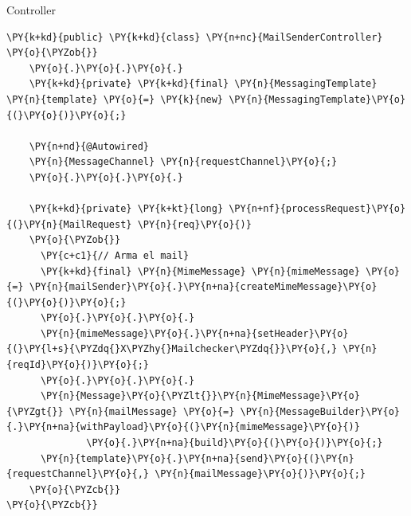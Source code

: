 \documentclass{beamer}
\begin{document}
\begin{frame}[fragile]{Controller}
\begin{Verbatim}[fontsize=\tiny,commandchars=\\\{\}]
\PY{k+kd}{public} \PY{k+kd}{class} \PY{n+nc}{MailSenderController}
\PY{o}{\PYZob{}}
    \PY{o}{.}\PY{o}{.}\PY{o}{.}
    \PY{k+kd}{private} \PY{k+kd}{final} \PY{n}{MessagingTemplate} \PY{n}{template} \PY{o}{=} \PY{k}{new} \PY{n}{MessagingTemplate}\PY{o}{(}\PY{o}{)}\PY{o}{;}

    \PY{n+nd}{@Autowired}
    \PY{n}{MessageChannel} \PY{n}{requestChannel}\PY{o}{;}
    \PY{o}{.}\PY{o}{.}\PY{o}{.}
    
    \PY{k+kd}{private} \PY{k+kt}{long} \PY{n+nf}{processRequest}\PY{o}{(}\PY{n}{MailRequest} \PY{n}{req}\PY{o}{)}
    \PY{o}{\PYZob{}}
      \PY{c+c1}{// Arma el mail}
      \PY{k+kd}{final} \PY{n}{MimeMessage} \PY{n}{mimeMessage} \PY{o}{=} \PY{n}{mailSender}\PY{o}{.}\PY{n+na}{createMimeMessage}\PY{o}{(}\PY{o}{)}\PY{o}{;}
      \PY{o}{.}\PY{o}{.}\PY{o}{.}
      \PY{n}{mimeMessage}\PY{o}{.}\PY{n+na}{setHeader}\PY{o}{(}\PY{l+s}{\PYZdq{}X\PYZhy{}Mailchecker\PYZdq{}}\PY{o}{,} \PY{n}{reqId}\PY{o}{)}\PY{o}{;}
      \PY{o}{.}\PY{o}{.}\PY{o}{.}
      \PY{n}{Message}\PY{o}{\PYZlt{}}\PY{n}{MimeMessage}\PY{o}{\PYZgt{}} \PY{n}{mailMessage} \PY{o}{=} \PY{n}{MessageBuilder}\PY{o}{.}\PY{n+na}{withPayload}\PY{o}{(}\PY{n}{mimeMessage}\PY{o}{)}
              \PY{o}{.}\PY{n+na}{build}\PY{o}{(}\PY{o}{)}\PY{o}{;}
      \PY{n}{template}\PY{o}{.}\PY{n+na}{send}\PY{o}{(}\PY{n}{requestChannel}\PY{o}{,} \PY{n}{mailMessage}\PY{o}{)}\PY{o}{;}      
    \PY{o}{\PYZcb{}}
\PY{o}{\PYZcb{}}
\end{Verbatim}
\end{frame}
\end{document}
